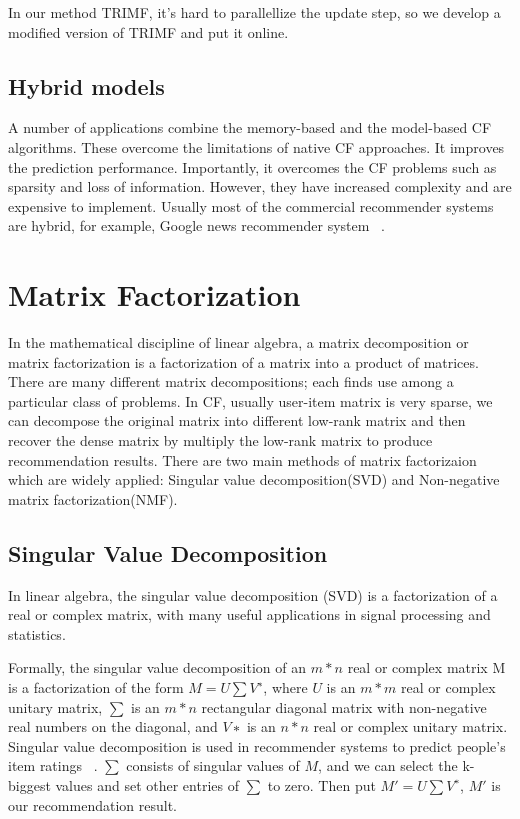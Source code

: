 In our method TRIMF, it's hard to parallellize the update step, so we develop a modified version of TRIMF and put it online.

\hspace{0.05in}
\subsection{Hybrid models}
A number of applications combine the memory-based and the model-based CF algorithms. These overcome the limitations of native CF approaches. It improves the prediction performance. Importantly, it overcomes the CF problems such as sparsity and loss of information. However, they have increased complexity and are expensive to implement. Usually most of the commercial recommender systems are hybrid, for example, Google news recommender system ~\cite{das2007google}.

\hspace{0.1in}
\section{Matrix Factorization}
In the mathematical discipline of linear algebra, a matrix decomposition or matrix factorization is a factorization of a matrix into a product of matrices. There are many different matrix decompositions; each finds use among a particular class of problems. In CF, usually user-item matrix is very sparse, we can decompose the original matrix into different low-rank matrix and then recover the dense matrix by multiply the low-rank matrix to produce recommendation results. There are two main methods of matrix factorizaion which are widely applied: Singular value decomposition(SVD) and Non-negative matrix factorization(NMF).
\hspace{0.05in}
\subsection{Singular Value Decomposition}
In linear algebra, the singular value decomposition (SVD) is a factorization of a real or complex matrix, with many useful applications in signal processing and statistics.

Formally, the singular value decomposition of an $m * n$ real or complex matrix M is a factorization of the form $M = U \sum V^∗$, where $U$ is an $m * m$ real or complex unitary matrix, $\sum$ is an $m * n$ rectangular diagonal matrix with non-negative real numbers on the diagonal, and $V∗$ is an $n * n$ real or complex unitary matrix. Singular value decomposition is used in recommender systems to predict people's item ratings ~\cite{Sarwar00applicationof}. $\sum$ consists of singular values of $M$, and we can select the k-biggest values and set other entries of $\sum$ to zero. Then put $M' = U \sum V^∗$, $M'$ is our recommendation result.

